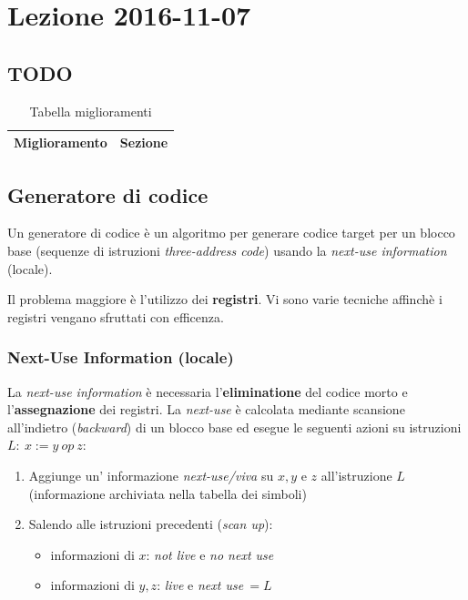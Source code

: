 \section{Lezione 2016-11-07}
\subsection{TODO}
\begin{table}[H]
\begin{center}
\begin{tabular}{|p{\textwidth}|c|}
\hline
\multicolumn{1}{|c|}{\textbf{Miglioramento}} & \textbf{Sezione} \\ \hline
\end{tabular}
\end{center}
\caption{Tabella miglioramenti}
\label{tab:tab_todo}
\end{table}

\subsection{Generatore di codice}
\begin{definition}
Un generatore di codice \`e un algoritmo per generare codice target per un
blocco base (sequenze di istruzioni \textit{three-address code}) usando la
\textit{next-use information} (locale).
\end{definition}

Il problema maggiore \`e l'utilizzo dei \textbf{registri}. Vi sono varie
tecniche affinch\`e i registri vengano sfruttati con efficenza.

\subsubsection{Next-Use Information (locale)}
La \textit{next-use information} \`e necessaria l'\textbf{eliminatione} del
codice morto e l'\textbf{assegnazione} dei registri. La \textit{next-use} \`e
calcolata mediante scansione all'indietro (\textit{backward}) di un blocco base
ed esegue le seguenti azioni su istruzioni $L: \ x := y \ op \ z$:
\begin{enumerate}
\item Aggiunge un' informazione \textit{next-use/viva} su $x,y$ e $z$
all'istruzione $L$ (informazione archiviata nella tabella dei simboli)
\item Salendo alle istruzioni precedenti (\textit{scan up}):
\begin{itemize}
\item informazioni di $x$: \textit{not live} e \textit{no next use}
\item informazioni di $y,z$: \textit{live} e \textit{next use}$\ =L$
\end{itemize}
\end{enumerate}

